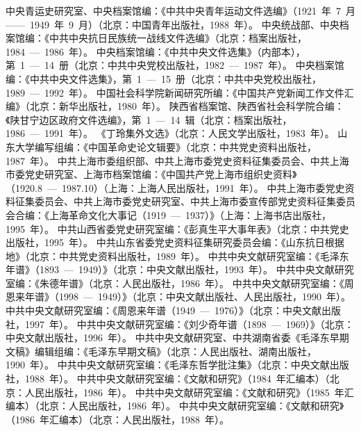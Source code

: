 
\begin{thebibliography}{999}
\bibitem{}中央青运史研究室、中央档案馆编：《中共中央青年运动文件选编》（1921~年~7~月——~1949~年~9~月）（北京：中国青年出版社，1988~年）。
\bibitem{}中央统战部、中央档案馆编：《中共中央抗日民族统一战线文件选编》（北京：档案出版社，1984~—~1986~年）。
\bibitem{}中央档案馆编：《中共中央文件选集》（内部本），第~1~—~14~册（北京：中共中央党校出版社，1982~—~1987~年）。
\bibitem{}中央档案馆编：《中共中央文件选集》，第~1~—~15~册（北京：中共中央党校出版社，1989~—~1992~年）。
\bibitem{}中国社会科学院新闻研究所编：《中国共产党新闻工作文件汇编》（北京：新华出版社，1980~年）。
\bibitem{}陕西省档案馆、陕西省社会科学院合编：《陕甘宁边区政府文件选编》，第~1~—~14~辑（北京：档案出版社，1986~—~1991~年）。
\bibitem{}《丁玲集外文选》（北京：人民文学出版社，1983~年）。
\bibitem{}山东大学编写组编：《中国革命史论文辑要》（北京：中共党史资料出版社，1987~年）。
\bibitem{}中共上海市委组织部、中共上海市委党史资料征集委员会、中共上海市委党史研究室、上海市档案馆编：《中国共产党上海市组织史资料》（1920.8~—~1987.10）（上海：上海人民出版社，1991~年）。
\bibitem{}中共上海市委党史资料征集委员会、中共上海市委党史研究室、中共上海市委宣传部党史资料征集委员会合编：《上海革命文化大事记（1919~—~1937）》（上海：上海书店出版社，1995~年）。
\bibitem{}中共山西省委党史研究室编：《彭真生平大事年表》（北京：中共党史出版社，1995~年）。
\bibitem{}中共山东省委党史资料征集研究委员会编：《山东抗日根据地》（北京：中共党史资料出版社，1989~年）。
\bibitem{}中共中央文献研究室编：《毛泽东年谱》（1893~—~1949）》（北京：中央文献出版社，1993~年）。
\bibitem{}中共中央文献研究室编：《朱德年谱》（北京：人民出版社，1986~年）。
\bibitem{}中共中央文献研究室编：《周恩来年谱》（1998~—~1949）》（北京：中央文献出版社、人民出版社，1990~年）。
\bibitem{}中共中央文献研究室编：《周恩来年谱（1949~—~1976）》（北京：中央文献出版社，1997~年）。
\bibitem{}中共中央文献研究室编：《刘少奇年谱（1898~—~1969）》（北京：中央文献出版社，1996~年）。
\bibitem{}中共中央文献研究室、中共湖南省委《毛泽东早期文稿》编辑组编：《毛泽东早期文稿》（北京：人民出版社、湖南出版社，1990~年）。
\bibitem{}中共中央文献研究室编：《毛泽东哲学批注集》（北京：中央文献出版社，1988~年）。
\bibitem{}中共中央文献研究室编：《文献和研究》（1984~年汇编本）（北京：人民出版社，1986~年）。
\bibitem{}中共中央文献研究室编：《文献和研究》（1985~年汇编本）（北京：人民出版社，1986~年）。
\bibitem{}中共中央文献研究室编：《文献和研究》（1986~年汇编本）（北京：人民出版社，1988~年）。

\end{thebibliography}

